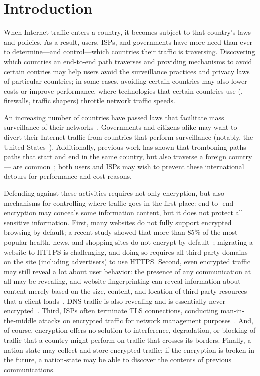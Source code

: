 \section{Introduction}
\label{intro}

When Internet traffic enters a country, it becomes subject to that country's
laws and policies.  As a result, users, ISPs, and governments have more need
than ever to determine---and control---which countries their traffic is
traversing.  Discovering which countries an end-to-end path traverses and
providing mechanisms to avoid certain contries may help users avoid the
surveillance practices and privacy laws of particular countries; in some
cases, avoiding certain countries may also lower costs or improve performance,
where technologies that certain countries use (\ie, firewalls, traffic
shapers) throttle network traffic speeds. 

An increasing number of countries have passed laws that facilitate mass
surveillance of their networks~\cite{france_surveillance,
netherlands_surveillance, kazak_surveillance, uk_bill}. Governments and
citizens alike may want to divert their Internet traffic from countries that
perform surveillance (notably, the United States~\cite{russia_secure_internet,
routing_errors, dte}).   Additionally, previous work has shown that tromboning
paths---paths that start and end in the same country, but also traverse a
foreign country--- are common~\cite{shah2015characterizing, gupta2014peering};
both users and ISPs may wish to prevent these international detours for
performance and cost reasons.

Defending against these activities requires not only encryption, but
also mechanisms for controlling where traffic goes in the first place: end-to-
end encryption may conceals some information content, but it does not protect
all sensitive information.  First, many websites do not fully support
encrypted browsing by default; a recent study showed that more than 85\% of
the most popular health, news, and shopping sites do not encrypt by
default~\cite{what_isps_can_see}; migrating a website to HTTPS is challenging,
and doing so requires all third-party domains on the site (including
advertisers) to use HTTPS.  Second, even encrypted traffic may still reveal a
lot about user behavior: the presence of any communication at all may be
revealing, and website fingerprinting can reveal information about content
merely based on the size, content, and location of third-party resources that
a client loads~\cite{Johnson2013a}. DNS traffic is also revealing and is
essentially never encrypted~\cite{what_isps_can_see}.  Third, ISPs often
terminate TLS connections, conducting man-in-the-middle attacks on encrypted
traffic for network management purposes~\cite{mitm_isp}.  And, of course,
encryption offers no solution to interference, degradation, or blocking of
traffic that a country might perform on traffic that crosses its borders.
Finally, a nation-state may collect and store encrypted traffic; if the
encryption is broken in the future, a nation-state may be able to discover the
contents of previous communications.

